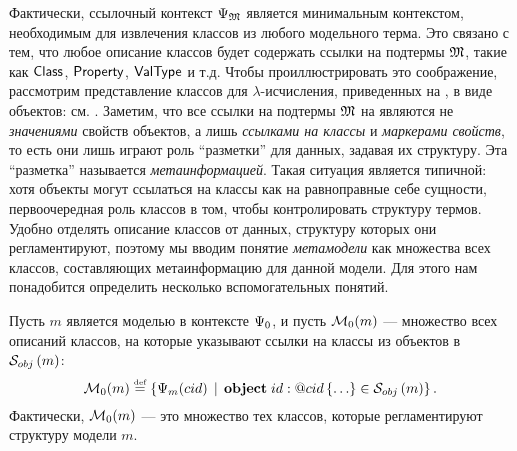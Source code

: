 Фактически, ссылочный контекст $\Psi_{\mathfrak{M}}$ является минимальным контекстом, необходимым для извлечения классов из любого модельного терма. Это связано с тем, что любое описание классов будет содержать ссылки на подтермы $\mathfrak{M}$, такие как $\mathsf{Class}$, $\mathsf{Property}$, $\mathsf{ValType}$ и т.д. Чтобы проиллюстрировать это соображение, рассмотрим представление классов для $\lambda$-исчисления, приведенных на , в виде объектов: см. . 
%
%
Заметим, что все ссылки на подтермы $\mathfrak{M}$ на  являются не \emph{значениями} свойств объектов, а лишь \emph{ссылками на классы} и \emph{маркерами свойств}, то есть они лишь играют роль ``разметки'' для данных, задавая их структуру. Эта ``разметка'' называется \emph{метаинформацией}. Такая ситуация является типичной: хотя объекты могут ссылаться на классы как на равноправные себе сущности, первоочередная роль классов в том, чтобы контролировать структуру термов. Удобно отделять описание классов от данных, структуру которых они регламентируют, поэтому мы вводим понятие \emph{метамодели} как множества всех классов, составляющих метаинформацию для данной модели. Для этого нам понадобится определить несколько вспомогательных понятий.

Пусть $m$ является моделью в контексте $\Psi_0$, и пусть $\mathcal{M}_0(m)$ --- множество всех описаний классов, на которые указывают ссылки на классы из объектов в $\mathcal{S}_{obj}\left(m\right)$:
$$\mathcal{M}_0(m) \stackrel{\text{\tiny def}}{=} \left\{ \Psi_m(cid) \;\,|\;\, \mathbf{object}\;id : @cid\left\{ \ldots \right\} \in \mathcal{S}_{obj}\left(m\right)\right\}.$$
Фактически, $\mathcal{M}_0(m)$ --- это множество тех классов, которые регламентируют структуру модели $m$.

